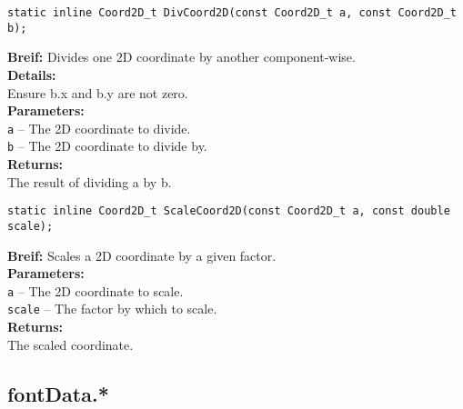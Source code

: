 \begin{verbatim}
static inline Coord2D_t DivCoord2D(const Coord2D_t a, const Coord2D_t b);
\end{verbatim}
\textbf{Breif:} Divides one 2D coordinate by another component-wise. \\
\textbf{Details:} \\
\hspace*{1cm}Ensure b.x and b.y are not zero. \\
\textbf{Parameters:} \\
\hspace*{1cm}\texttt{a} -- The 2D coordinate to divide. \\
\hspace*{1cm}\texttt{b} -- The 2D coordinate to divide by. \\
\textbf{Returns:} \\
\hspace*{1cm}The result of dividing a by b. \\[1em]

\begin{verbatim}
static inline Coord2D_t ScaleCoord2D(const Coord2D_t a, const double scale);
\end{verbatim}
\textbf{Breif:} Scales a 2D coordinate by a given factor. \\
\textbf{Parameters:} \\
\hspace*{1cm}\texttt{a} -- The 2D coordinate to scale. \\
\hspace*{1cm}\texttt{scale} -- The factor by which to scale. \\
\textbf{Returns:} \\
\hspace*{1cm}The scaled coordinate. \\[1em]

\subsection{fontData.*}


